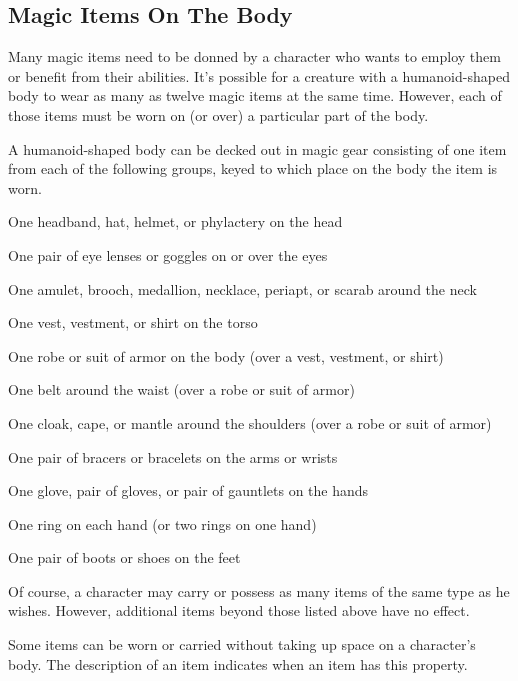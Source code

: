 \subsection{Magic Items On The Body}
Many magic items need to be donned by a character who wants to employ them or benefit from their abilities. It's possible for a creature with a humanoid-shaped body to wear as many as twelve magic items at the same time. However, each of those items must be worn on (or over) a particular part of the body.

A humanoid-shaped body can be decked out in magic gear consisting of one item from each of the following groups, keyed to which place on the body the item is worn.

\begin{itemize*}
\item One headband, hat, helmet, or phylactery on the head
\item One pair of eye lenses or goggles on or over the eyes
\item One amulet, brooch, medallion, necklace, periapt, or scarab around the neck
\item One vest, vestment, or shirt on the torso
\item One robe or suit of armor on the body (over a vest, vestment, or shirt)
\item One belt around the waist (over a robe or suit of armor)
\item One cloak, cape, or mantle around the shoulders (over a robe or suit of armor)
\item One pair of bracers or bracelets on the arms or wrists
\item One glove, pair of gloves, or pair of gauntlets on the hands
\item One ring on each hand (or two rings on one hand)
\item One pair of boots or shoes on the feet
\end{itemize*}

Of course, a character may carry or possess as many items of the same type as he wishes. However, additional items beyond those listed above have no effect.

Some items can be worn or carried without taking up space on a character's body. The description of an item indicates when an item has this property. 